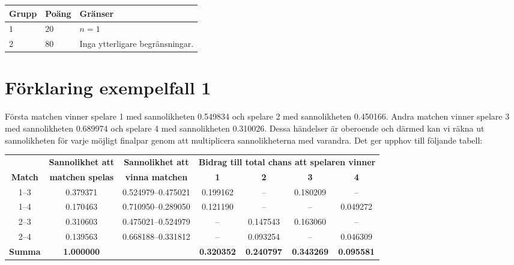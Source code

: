 \noindent
\begin{tabular}{| l | l | p{12cm} |}
  \hline
  \textbf{Grupp} & \textbf{Poäng} & \textbf{Gränser} \\ \hline
  $1$    & $20$       & $n=1$ \\ \hline
  $2$    & $80$       & Inga ytterligare begränsningar. \\ \hline
\end{tabular}

\section*{Förklaring exempelfall 1}
Första matchen vinner spelare 1 med sannolikheten 0.549834 och spelare 2 med sannolikheten 0.450166.
Andra matchen vinner spelare 3 med sannolikheten 0.689974 och spelare 4 med sannolikheten 0.310026.
Dessa händelser är oberoende och därmed kan vi räkna ut sannolikheten
för varje möjligt finalpar genom att multiplicera sannolikheterna med
varandra. Det ger upphov till följande tabell:

\begin{tabular}{|c|c|c|c|c|c|c|} \hline
 & {\bf Sannolikhet att} & {\bf Sannolikhet att} & \multicolumn{4}{|c|}{\bf Bidrag till total chans att spelaren vinner}  \\
{\bf Match} & {\bf matchen spelas} & {\bf vinna matchen} & {\bf
  1}&{\bf 2}&{\bf 3}&{\bf 4} \\ \hline
1--3 & 0.379371 & 0.524979--0.475021 & 0.199162 & -- & 0.180209 & -- \\
1--4 & 0.170463 & 0.710950--0.289050 & 0.121190 & -- & -- & 0.049272 \\
2--3 & 0.310603 & 0.475021--0.524979 & -- & 0.147543 & 0.163060 & -- \\
2--4 & 0.139563 & 0.668188--0.331812 & -- & 0.093254 & -- & 0.046309 \\ \hline
{\bf Summa }& {\bf 1.000000} &                & {\bf 0.320352} & {\bf 0.240797} & {\bf 0.343269 }& {\bf 0.095581 } \\ \hline
\end{tabular}
